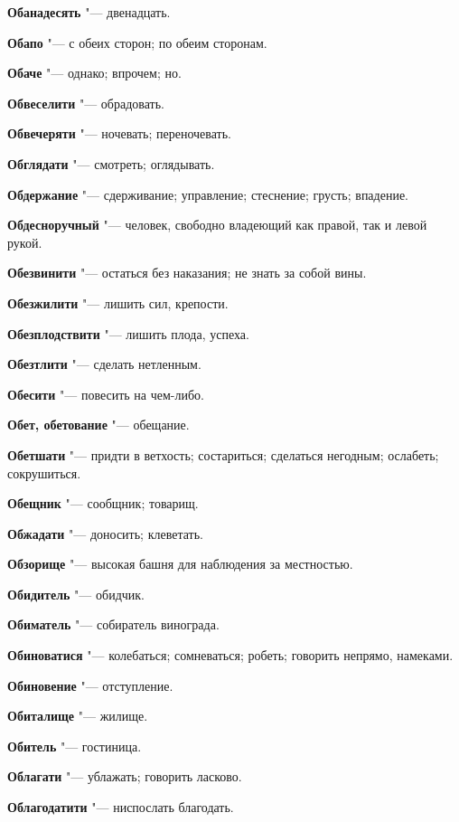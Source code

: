 \begin{mymulticols}
\noindent\textbf{Обанадесять} "--- двенадцать. 

\noindent\textbf{Обапо} "--- с обеих сторон; по обеим сторонам. 

\noindent\textbf{Обаче} "--- однако; впрочем; но. 

\noindent\textbf{Обвеселити} "--- обрадовать. 

\noindent\textbf{Обвечеряти} "--- ночевать; переночевать. 

\noindent\textbf{Обглядати} "--- смотреть; оглядывать. 

\noindent\textbf{Обдержание} "--- сдерживание; управление; стеснение; грусть; впадение. 

\noindent\textbf{Обдесноручный} "--- человек, свободно владеющий как правой, так и левой рукой. 

\noindent\textbf{Обезвинити} "--- остаться без наказания; не знать за собой вины. 

\noindent\textbf{Обезжилити} "--- лишить сил, крепости. 

\noindent\textbf{Обезплодствити} "--- лишить плода, успеха. 

\noindent\textbf{Обезтлити} "--- сделать нетленным. 

\noindent\textbf{Обесити} "--- повесить на чем-либо. 

\noindent\textbf{Обет, обетование} "--- обещание. 

\noindent\textbf{Обетшати} "--- придти в ветхость; состариться; сделаться негодным; ослабеть; сокрушиться. 

\noindent\textbf{Обещник} "--- сообщник; товарищ. 

\noindent\textbf{Обжадати} "--- доносить; клеветать. 

\noindent\textbf{Обзорище} "--- высокая башня для наблюдения за местностью. 

\noindent\textbf{Обидитель} "--- обидчик. 

\noindent\textbf{Обиматель} "--- собиратель винограда. 

\noindent\textbf{Обиноватися} "--- колебаться; сомневаться; робеть; говорить непрямо, намеками. 

\noindent\textbf{Обиновение} "--- отступление. 

\noindent\textbf{Обиталище} "--- жилище. 

\noindent\textbf{Обитель} "--- гостиница. 

\noindent\textbf{Облагати} "--- ублажать; говорить ласково. 

\noindent\textbf{Облагодатити} "--- ниспослать благодать. 


\end{mymulticols}
